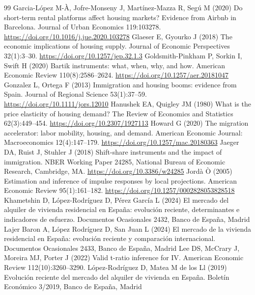 \begin{thebibliography}{99}
 Garcia-López M-À, Jofre-Monseny J, Martínez-Mazza R, Segú M (2020) Do short-term rental platforms affect housing markets? Evidence from Airbnb in Barcelona. Journal of Urban Economics 119:103278. \url{https://doi.org/10.1016/j.jue.2020.103278}
 Glaeser E, Gyourko J (2018) The economic implications of housing supply. Journal of Economic Perspectives 32(1):3--30. \url{https://doi.org/10.1257/jep.32.1.3}
 Goldsmith-Pinkham P, Sorkin I, Swift H (2020) Bartik instruments: what, when, why, and how. American Economic Review 110(8):2586--2624. \url{https://doi.org/10.1257/aer.20181047}
 Gonzalez L, Ortega F (2013) Immigration and housing booms: evidence from Spain. Journal of Regional Science 53(1):37--59. \url{https://doi.org/10.1111/jors.12010}
 Hanushek EA, Quigley JM (1980) What is the price elasticity of housing demand? The Review of Economics and Statistics 62(3):449--454. \url{https://doi.org/10.2307/1927113}
 Howard G (2020) The migration accelerator: labor mobility, housing, and demand. American Economic Journal: Macroeconomics 12(4):147--179. \url{https://doi.org/10.1257/mac.20180363}
 Jaeger DA, Ruist J, Stuhler J (2018) Shift-share instruments and the impact of immigration. NBER Working Paper 24285, National Bureau of Economic Research, Cambridge, MA. \url{https://doi.org/10.3386/w24285}
 Jordà Ò (2005) Estimation and inference of impulse responses by local projections. American Economic Review 95(1):161--182. \url{https://doi.org/10.1257/0002828053828518}
 Khametshin D, López-Rodríguez D, Pérez García L (2024) El mercado del alquiler de vivienda residencial en España: evolución reciente, determinantes e indicadores de esfuerzo. Documentos Ocasionales 2432, Banco de España, Madrid
 Lajer Baron A, López Rodríguez D, San Juan L (2024) El mercado de la vivienda residencial en España: evolución reciente y comparación internacional. Documentos Ocasionales 2433, Banco de España, Madrid
 Lee DS, McCrary J, Moreira MJ, Porter J (2022) Valid t-ratio inference for IV. American Economic Review 112(10):3260--3290.
 López-Rodríguez D, Matea M de los Ll (2019) Evolución reciente del mercado del alquiler de vivienda en España. Boletín Económico 3/2019, Banco de España, Madrid

\end{thebibliography}
